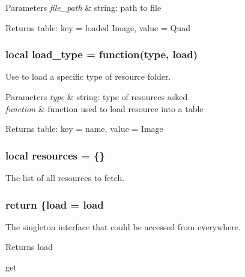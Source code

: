 \begin{DoxyParams}{Parameters}
{\em file\-\_\-path} & string\-: path to file \\
\hline
\end{DoxyParams}
\begin{DoxyReturn}{Returns}
table\-: key = loaded Image, value = Quad 
\end{DoxyReturn}
\hypertarget{resource_8lua_a475186f64c83bc588cbfbf5b5c5803f7}{
\subsubsection[{load\-\_\-type}]{\setlength{\rightskip}{0pt plus 5cm}local load\-\_\-type = function(type, {\bf load})}}\label{resource_8lua_a475186f64c83bc588cbfbf5b5c5803f7}


Use to load a specific type of resource folder. 


\begin{DoxyParams}{Parameters}
{\em type} & string\-: type of resources asked \\
\hline
{\em function} & function used to load resource into a table \\
\hline
\end{DoxyParams}
\begin{DoxyReturn}{Returns}
table\-: key = name, value = Image 
\end{DoxyReturn}
\hypertarget{resource_8lua_abddd3ad0a52ff83b482ee9e6dff95744}{
\subsubsection[{resources}]{\setlength{\rightskip}{0pt plus 5cm}local resources = \{\}}}\label{resource_8lua_abddd3ad0a52ff83b482ee9e6dff95744}


The list of all resources to fetch. 

\hypertarget{resource_8lua_a9717e7bbecb906637e86cef6da3d83c2}{
\subsubsection[{return}]{\setlength{\rightskip}{0pt plus 5cm}return \{{\bf load} = {\bf load}}}\label{resource_8lua_a9717e7bbecb906637e86cef6da3d83c2}


The singleton interface that could be accessed from everywhere. 

\begin{DoxyReturn}{Returns}
load 

get 
\end{DoxyReturn}
